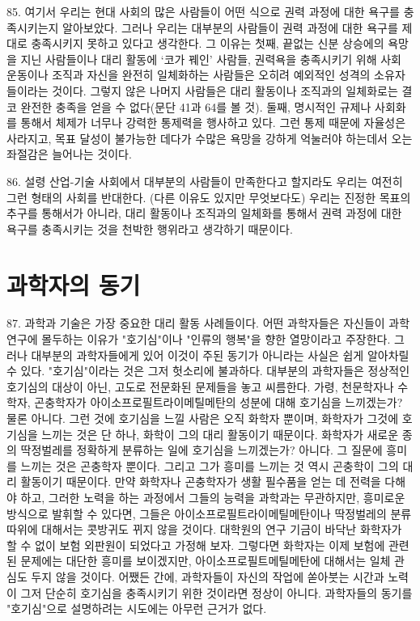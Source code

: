 \documentclass[11pt,a4paper]{article}
\begin{document}
\begin{multicols}{2}
85. 여기서 우리는 현대 사회의 많은 사람들이 어떤 식으로 권력 과정에 대한 욕구를 충족시키는지  알아보았다. 그러나 우리는 대부분의 사람들이 권력 과정에 대한 욕구를 제대로 충족시키지 못하고  있다고 생각한다. 그 이유는 첫째, 끝없는 신분 상승에의 욕망을 지닌 사람들이나 대리 활동에 `코가 꿰인' 사람들, 권력욕을 충족시키기 위해 사회 운동이나 조직과 자신을 완전히 일체화하는 사람들은 오히려
예외적인 성격의 소유자들이라는 것이다. 그렇지 않은 나머지 사람들은 대리 활동이나 조직과의  일체화로는 결코 완전한 충족을 얻을 수 없다(문단 41과 64를 볼 것). 둘째, 명시적인 규제나 사회화를  통해서 체제가 너무나 강력한 통제력을 행사하고 있다. 그런 통제 때문에 자율성은 사라지고, 목표 달성이 불가능한 데다가 수많은 욕망을 강하게 억눌러야 하는데서 오는 좌절감은 늘어나는 것이다. 


86. 설령 산업-기술 사회에서 대부분의 사람들이 만족한다고 할지라도 우리는 여전히 그런 형태의 사회를 반대한다. (다른 이유도 있지만 무엇보다도) 우리는 진정한 목표의 추구를 통해서가 아니라, 대리  활동이나 조직과의 일체화를 통해서 권력 과정에 대한 욕구를 충족시키는 것을 천박한 행위라고 생각하기 때문이다.  


\section*{과학자의 동기} 
87. 과학과 기술은 가장 중요한 대리 활동 사례들이다. 어떤 과학자들은 자신들이 과학 연구에 몰두하는  이유가 "호기심"이나 "인류의 행복"을 향한 열망이라고 주장한다. 그러나 대부분의 과학자들에게 있어  이것이 주된 동기가 아니라는 사실은 쉽게 알아차릴 수 있다. "호기심"이라는 것은 그저 헛소리에  불과하다. 대부분의 과학자들은 정상적인 호기심의 대상이 아닌, 고도로 전문화된 문제들을 놓고  씨름한다. 가령, 천문학자나 수학자, 곤충학자가 아이소프로필트라이메틸메탄의 성분에 대해 호기심을  느끼겠는가? 물론 아니다. 그런 것에 호기심을 느낄 사람은 오직 화학자 뿐이며, 화학자가 그것에  호기심을 느끼는 것은 단 하나, 화학이 그의 대리 활동이기 때문이다. 화학자가 새로운 종의 딱정벌레를  정확하게 분류하는 일에 호기심을 느끼겠는가? 아니다. 그 질문에 흥미를 느끼는 것은 곤충학자 뿐이다.  그리고 그가 흥미를 느끼는 것 역시 곤충학이 그의 대리 활동이기 때문이다. 만약 화학자나 곤충학자가  생활 필수품을 얻는 데 전력을 다해야 하고, 그러한 노력을 하는 과정에서 그들의 능력을 과학과는  무관하지만, 흥미로운 방식으로 발휘할 수 있다면, 그들은 아이소프로필트라이메틸메탄이나 딱정벌레의  분류 따위에 대해서는 콧방귀도 뀌지 않을 것이다. 대학원의 연구 기금이 바닥난 화학자가 할 수 없이  보험 외판원이 되었다고 가정해 보자. 그렇다면 화학자는 이제 보험에 관련된 문제에는 대단한 흥미를  보이겠지만, 아이소프로필트메틸메탄에 대해서는 일체 관심도 두지 않을 것이다. 어쨌든 간에,  과학자들이 자신의 작업에 쏟아붓는 시간과 노력이 그저 단순히 호기심을 충족시키기 위한 것이라면  정상이 아니다. 과학자들의 동기를 "호기심"으로 설명하려는 시도에는 아무런 근거가 없다. 



\end{multicols}
\end{document}
